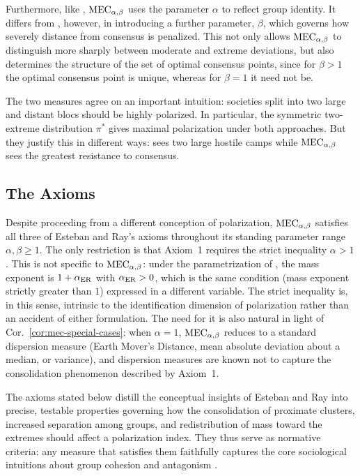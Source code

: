 Furthermore, like \ERLabel, $\MEC$ uses the parameter $\alpha$ to reflect group identity. It differs from \ERLabel, however, in introducing a further parameter, $\beta$, which governs how severely distance from consensus is penalized. This not only allows $\MEC$ to distinguish more sharply between moderate and extreme deviations, but also determines the structure of the set of optimal consensus points, since for $\beta>1$ the optimal consensus point is unique, whereas for $\beta=1$ it need not be.

The two measures agree on an important intuition: societies split into two large and distant blocs should be highly polarized. In particular, the symmetric two-extreme distribution $\pi^*$ gives  maximal polarization under both approaches. But they justify this in different ways: \ERLabel{} sees two large hostile camps while $\MEC$ sees the greatest resistance to consensus.

\subsection{The \texorpdfstring{\ERLabel}{ER} Axioms}\label{sec:er-axioms}


Despite proceeding from a different conception of polarization, $\MEC$ satisfies all three of Esteban and Ray's axioms throughout its standing parameter range $\alpha,\beta\geq 1$. The only restriction is that Axiom~1 requires the strict inequality $\alpha>1$. This is not specific to $\MEC$: under the parametrization of \cite{esteban1994measurement}, the mass exponent is $1+\alpha_{\ERLabel}$ with $\alpha_{\ERLabel}>0$, which is the same condition (mass exponent strictly greater than $1$) expressed in a different variable. The strict inequality is, in this sense, intrinsic to the identification dimension of polarization rather than an accident of either formulation. The need for it is also natural in light of Cor.~\ref{cor:mec-special-cases}: when $\alpha=1$, $\MEC$ reduces to a standard dispersion measure (Earth Mover's Distance, mean absolute deviation about a median, or variance), and dispersion measures are known not to capture the consolidation phenomenon described by Axiom~1.



The axioms stated below distill the conceptual insights of Esteban and Ray into precise, testable properties governing how the consolidation of proximate clusters, increased separation among groups, and redistribution of mass toward the extremes should affect a polarization index. They thus serve as normative criteria: any measure that satisfies them faithfully captures the core sociological intuitions about group cohesion and antagonism \cite{kawada2018characterization}.

